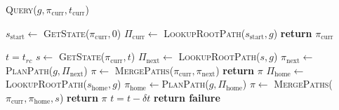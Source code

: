 \documentclass[letterpaper]{article} %
\begin{document}
\begin{algorithm}
\caption{\textsc{Query}($g, \pi_{\textrm{curr}},t_{\textrm{curr}}$)}\label{alg:1}
\begin{algorithmic}[1]
    \State $s_{\textrm{start}} \leftarrow$ \textsc{GetState}($\pi_{\textrm{curr}}, 0$) 
    \State $\Pi_{\textrm{curr}} \leftarrow$ \textsc{LookupRootPath}($s_{\textrm{start}},g$)
        \State \textbf{return} $\pi_{\textrm{curr}}$
    \EndIf

\State $t = t_{rc}$
    \State $s \leftarrow$ \textsc{GetState}($\pi_{\textrm{curr}}, t$)
    \State $\Pi_{\textrm{next}} \leftarrow$  \textsc{LookupRootPath}($s,g$)
        \State $\pi_{\textrm{next}} \leftarrow$\textsc{PlanPath}($g,\Pi_{\textrm{next}}$)
        \State $\pi \leftarrow$ \textsc{MergePaths}($\pi_{\textrm{curr}},\pi_{\textrm{next}}$)
        \State \textbf{return} $\pi$
    \EndIf
    {\color{blue}
    \State $\Pi_{\textrm{home}} \leftarrow$ \textsc{LookupRootPath}($s_{\textrm{home}},g$)
            \State $\pi_{\textrm{home}} \leftarrow$\textsc{PlanPath}($g,\Pi_{\textrm{home}}$)
            \State $\pi \leftarrow$ \textsc{MergePaths}($\pi_{\textrm{curr}},\pi_{\textrm{home}}, s$)
            \State \textbf{return} $\pi$
        \EndIf
    \EndIf
    }
    \State $t = t - \delta t$
\EndWhile
\State \textbf{return failure}
\end{algorithmic}
\end{algorithm}
\end{document}
